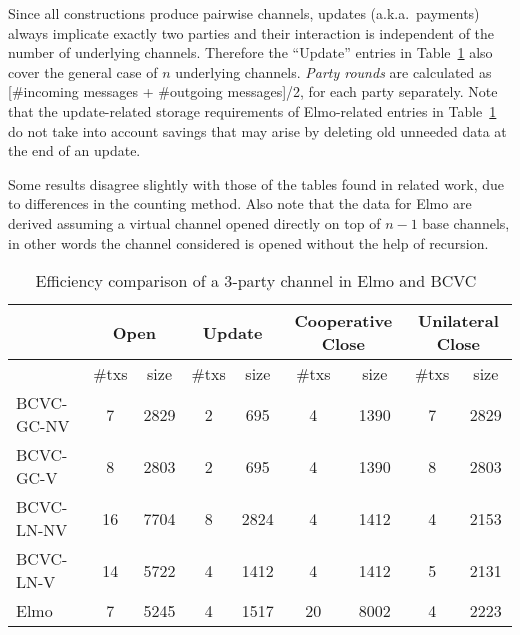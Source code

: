   Since all constructions produce pairwise channels, updates (a.k.a.\ payments)
  always implicate exactly two parties and
  their interaction is independent of the number of underlying channels.
  Therefore the ``Update'' entries in
  Table~\ref{table:comparison:overhead:3-parties} also cover the general case of
  $n$ underlying channels. \emph{Party rounds} are calculated as
  [\#incoming messages + \#outgoing messages]/2, for each party
  separately. Note that the update-related storage requirements of Elmo-related
  entries in Table~\ref{table:comparison:overhead:3-parties} do not take into
  account savings that may arise by deleting old unneeded data at the end of an
  update.

  Some results disagree slightly with those of the tables found in related work,
  due to differences in the counting method. Also note that the data for Elmo
  are derived assuming a virtual channel opened directly on top of $n-1$ base
  channels, in other words the channel considered is opened without the help of
  recursion.

  \addtolength{\intextsep}{-15pt}
  \begin{table}[h!]
    \begin{minipage}{\textwidth}
    \centering
    \begin{tabular}{|l|c|c|c|c|c|c|c|c|}
    \hline
              & \multicolumn{2}{|c|}{Open}
              & \multicolumn{2}{|c|}{Update}
              & \multicolumn{2}{|c|}{Cooperative Close}
              & \multicolumn{2}{|c|}{Unilateral Close} \\
    \hline
              & \#txs & size & \#txs & size & \#txs & size & \#txs & size \\
    \hline
    BCVC-GC-NV
              & 7 & 2829 & 2 & 695 & 4 & 1390 & 7 & 2829 \\
    \hline
    BCVC-GC-V & 8 & 2803 & 2 & 695 & 4 & 1390 & 8 & 2803 \\
    \hline
    BCVC-LN-NV
              & 16 & 7704 & 8 & 2824 & 4 & 1412 & 4 & 2153 \\
    \hline
    BCVC-LN-V & 14 & 5722 & 4 & 1412 & 4 & 1412 & 5 & 2131 \\
    \hline
    Elmo      & 7 & 5245 & 4 & 1517 & 20 & 8002 & 4 & 2223 \\
    \hline
    \end{tabular}
    \end{minipage}
    \caption{Efficiency comparison of a $3$-party channel in Elmo and
    BCVC~\cite{9519487}}
    \label{table:comparison:overhead:3-parties}
  \end{table}
  \addtolength{\intextsep}{15pt}


